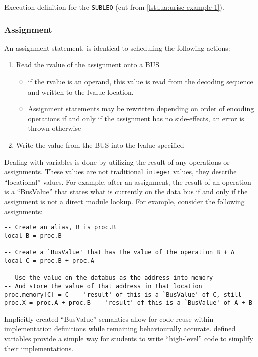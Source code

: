 \begin{listing}[h!]
    \inputminted[escapeinside=||, firstline=61, lastline=71]{lua}{./listings/urisc.lua}
    \caption{Execution definition for the \texttt{SUBLEQ}  (cut from \cref{lst:lua:urisc-example-1}).}
    \label{lst:lua:urisc:exec}
\end{listing}

\subsubsection*{Assignment}

An assignment statement,  is identical to scheduling the following actions: 
\begin{enumerate}
    \item Read the rvalue \cite{cppreference:ValueCategories} of the assignment onto a BUS
    \begin{itemize}
        \item if the rvalue is an operand, this value is read from the decoding sequence and written to the lvalue \cite{cppreference:ValueCategories} location.
        \item Assignment statements may be rewritten depending on order of encoding operations if and only if the assignment has no side-effects, an error is thrown otherwise
    \end{itemize}
    \item Write the value from the BUS into the lvalue specified
\end{enumerate}
Dealing with  variables is done by utilizing the result of any operations or assignments. These values are not traditional \texttt{integer} values, they describe ``locational'' values. For example, after an assignment, the result of an operation is a ``BusValue'' that states what is currently on the data bus if and only if the assignment is not a direct module lookup. For example, consider the following  assignments: 
\begin{verbatim}
-- Create an alias, B is proc.B
local B = proc.B

-- Create a `BusValue' that has the value of the operation B + A
local C = proc.B + proc.A

-- Use the value on the databus as the address into memory
-- And store the value of that address in that location
proc.memory[C] = C -- 'result' of this is a `BusValue' of C, still
proc.X = proc.A + proc.B -- 'result' of this is a `BusValue' of A + B
\end{verbatim}
Implicitly created ``BusValue'' semantics allow for code reuse within implementation definitions while remaining behaviourally accurate.  defined variables provide a simple way for students to write ``high-level'' code to simplify their implementations.

